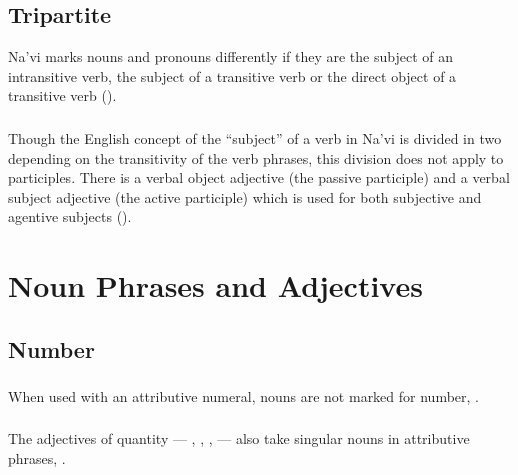 \subsection{Tripartite} Na'vi marks nouns and pronouns differently if
they are the subject of an intransitive verb, the subject of a
transitive verb or the direct object of a transitive verb
().

\subsubsection{} Though the English concept of the ``subject'' of a
verb in Na'vi is divided in two depending on the transitivity of the
verb phrases, this division does not apply to participles.  There is a
verbal object adjective (the passive participle) and a verbal subject
adjective (the active participle) which is used for both subjective
and agentive subjects ().

\subsubsection{} 


\section{Noun Phrases and Adjectives}

\subsection{Number} 

\subsubsection{} When used with an attributive numeral, nouns are not
marked for number,  .

\subsubsection{} The adjectives of quantity ---  ,
 ,  ,   --- also take singular nouns in attributive phrases,  .

